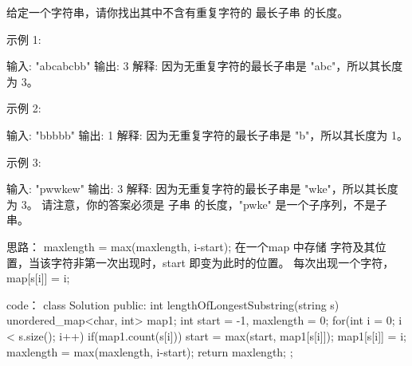 给定一个字符串，请你找出其中不含有重复字符的 最长子串 的长度。

示例 1:

输入: "abcabcbb"
输出: 3 
解释: 因为无重复字符的最长子串是 "abc"，所以其长度为 3。

示例 2:

输入: "bbbbb"
输出: 1
解释: 因为无重复字符的最长子串是 "b"，所以其长度为 1。

示例 3:

输入: "pwwkew"
输出: 3
解释: 因为无重复字符的最长子串是 "wke"，所以其长度为 3。
     请注意，你的答案必须是 子串 的长度，"pwke" 是一个子序列，不是子串。
































思路：
maxlength = max(maxlength, i-start);
在一个map 中存储 字符及其位置，当该字符非第一次出现时，start 即变为此时的位置。
每次出现一个字符，map[s[i]] = i;






























code：
class Solution {
public:
    int lengthOfLongestSubstring(string s) {
        unordered_map<char, int> map1;
        int start = -1, maxlength = 0;
        for(int i = 0; i < s.size(); i++)
        {
            if(map1.count(s[i]))
                start = max(start, map1[s[i]]);
            map1[s[i]] = i;
            maxlength = max(maxlength, i-start);
        }
        return maxlength;
    }
};